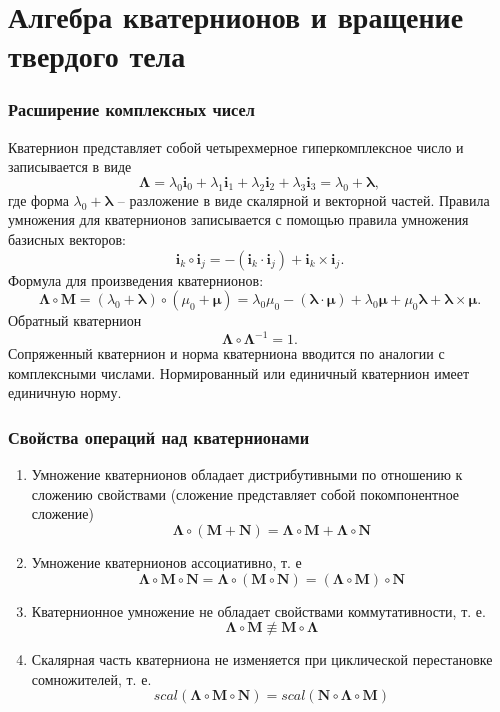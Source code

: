 \documentclass[utf8]{beamer}
\begin{document}
\section{Алгебра кватернионов и вращение твердого тела}
\begin{frame}
\frametitle{Расширение комплексных чисел}
Кватернион представляет собой четырехмерное гиперкомплексное число и
записывается в виде
$$
\mathbf{\Lambda} = \lambda_0 \mathbf{i}_0 + \lambda_1 \mathbf{i}_1 + \lambda_2
\mathbf{i}_2 + \lambda_3 \mathbf{i}_3 = \lambda_0 + \mathbf{\lambda},
$$
где форма $\lambda_0 + \mathbf{\lambda}$ -- разложение в виде
скалярной и векторной частей. Правила умножения для кватернионов
записывается с помощью правила умножения базисных векторов:
$$
\mathbf{i}_k\circ\mathbf{i}_j = -\left(\mathbf{i}_k \cdot\mathbf{i}_j\right) +
\mathbf{i}_k\times\mathbf{i}_j.
$$
Формула для произведения кватернионов:
$$
\mathbf{\Lambda}\circ\mathbf{M} = \left(\lambda_0
+\mathbf{\lambda}\right)\circ\left(\mu_0 + \mathbf{\mu}\right) = 
\lambda_0\mu_0 -\left(\mathbf{\lambda}\cdot\mathbf{\mu}\right) +
\lambda_0\mathbf{\mu} + \mu_0\mathbf{\lambda} +
    \mathbf{\lambda}\times\mathbf{\mu}.
$$
Обратный кватернион
$$
\mathbf{\Lambda}\circ\mathbf{\Lambda}^{-1} = 1.
$$
Сопряженный кватернион и норма кватерниона вводится по аналогии с комплексными
числами. Нормированный или единичный кватернион имеет единичную норму.
\end{frame}
\begin{frame}
\frametitle{Свойства операций над кватернионами}
\begin{enumerate}
\item Умножение кватернионов обладает дистрибутивными по отношению к сложению
    свойствами (сложение представляет собой покомпонентное сложение)
$$
\mathbf{\Lambda}\circ\left(\mathbf{M} + \mathbf{N}\right) =
\mathbf{\Lambda}\circ\mathbf{M} +
\mathbf{\Lambda}\circ\mathbf{N}
$$
\item Умножение кватернионов ассоциативно, т. е
$$
\mathbf{\Lambda}\circ\mathbf{M}\circ\mathbf{N} = 
\mathbf{\Lambda}\circ\left(\mathbf{M}\circ\mathbf{N}\right) = 
\left(\mathbf{\Lambda}\circ\mathbf{M}\right)\circ\mathbf{N} 
$$
\item Кватернионное умножение не обладает свойствами коммутативности, т. е.
$$
\mathbf{\Lambda}\circ\mathbf{M}\not\equiv\mathbf{M}\circ\mathbf{\Lambda}
$$
\item Скалярная часть кватерниона не изменяется при циклической перестановке
сомножителей, т. е. 
$$
scal\left(\mathbf{\Lambda}\circ\mathbf{M}\circ\mathbf{N}\right) =
scal\left(\mathbf{N}\circ\mathbf{\Lambda}\circ\mathbf{M}\right)
$$
\end{enumerate}
\end{frame}
\end{document}
